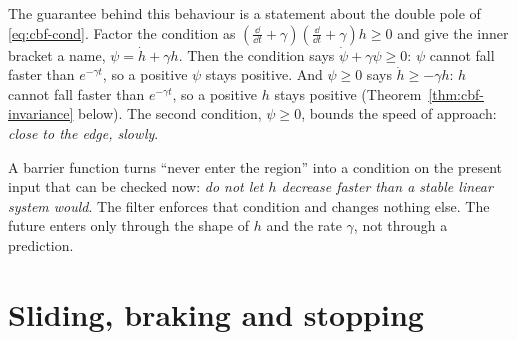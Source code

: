 The guarantee behind this behaviour is a statement about the double pole of \cref{eq:cbf-cond}. Factor the condition as $(\tfrac{\dd}{\dd t} + \gamma)(\tfrac{\dd}{\dd t} + \gamma)h \ge 0$ and give the inner bracket a name, $\psi = \dot h + \gamma h$. Then the condition says $\dot\psi + \gamma\psi \ge 0$: $\psi$ cannot fall faster than $e^{-\gamma t}$, so a positive $\psi$ stays positive. And $\psi \ge 0$ says $\dot h \ge -\gamma h$: $h$ cannot fall faster than $e^{-\gamma t}$, so a positive $h$ stays positive (Theorem~\ref{thm:cbf-invariance} below). The second condition, $\psi \ge 0$, bounds the speed of approach: \emph{close to the edge, slowly}.

\begin{keyidea}
A barrier function turns \enquote{never enter the region} into a condition on the present input that can be checked now: \emph{do not let $h$ decrease faster than a stable linear system would}. The filter enforces that condition and changes nothing else. The future enters only through the shape of $h$ and the rate $\gamma$, not through a prediction.
\end{keyidea}

\section{Sliding, braking and stopping}

